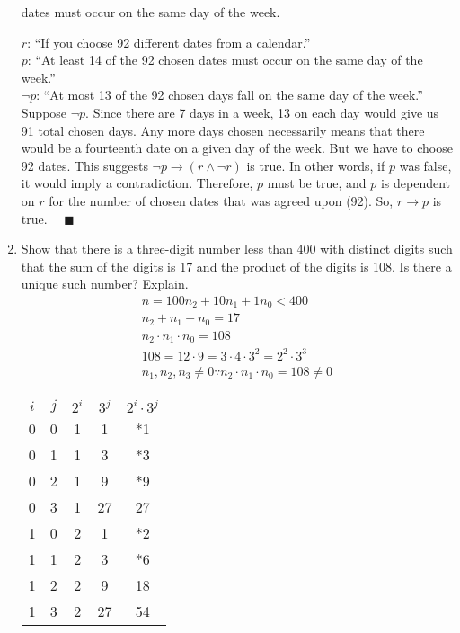 \documentclass[letterpaper, 12pt]{article}
\newcommand{\qed}{\quad \blacksquare}
\newcommand{\then}{\rightarrow}
\begin{document}
\begin{enumerate}
dates must occur on the same day of the week.
\begin{flushleft}
    $r$: ``If you choose 92 different dates from a calendar.'' \\
    $p$: ``At least 14 of the 92 chosen dates must occur on the same day of the week.'' \\
    $\neg p$: ``At most 13 of the 92 chosen days fall on the same day of the week.'' \\
    Suppose $\neg p$. Since there are 7 days in a week, 13 on each day would give us 91 total 
    chosen days. Any more days chosen necessarily means that there would be a fourteenth date 
    on a given day of the week. But we have to choose 92 dates. This suggests 
    $\neg p \then (r \wedge \neg r)$ is true. In other words, if $p$ was false, it would imply 
    a contradiction. Therefore, $p$ must be true, and $p$ is dependent on $r$ for the number of 
    chosen dates that was agreed upon (92). So, $r \then p$ is true. $\qed$
\end{flushleft}
\pagebreak
\item Show that there is a three-digit number less than 400 with distinct digits such that 
the sum of the digits is 17 and the product of the digits is 108. Is there a unique such number? 
Explain.
\begin{gather*}
    n = 100n_2 + 10n_1 + 1n_0 < 400 \\
    n_2 + n_1 + n_0 = 17 \\
    n_2 \cdot n_1 \cdot n_0 = 108 \\
    108 = 12 \cdot 9 = 3 \cdot 4 \cdot 3^2 = 2^2 \cdot 3^3 \\
    n_1, n_2, n_3 \ne 0 \because n_2 \cdot n_1 \cdot n_0 = 108 \ne 0
\end{gather*}
\begin{center}
    \begin{tabular}{c | c | c | c | c}
        $i$ & $j$ & $2^i$ & $3^j$ & $2^i \cdot 3^j$ \\
        0 & 0 & 1 & 1 & *1 \\
        0 & 1 & 1 & 3 & *3 \\
        0 & 2 & 1 & 9 & *9 \\
        0 & 3 & 1 & 27 & 27 \\
        1 & 0 & 2 & 1 & *2 \\
        1 & 1 & 2 & 3 & *6 \\
        1 & 2 & 2 & 9 & 18 \\
        1 & 3 & 2 & 27 & 54 \\

\end{tabular}
\end{center}
\end{enumerate}
\end{document}
